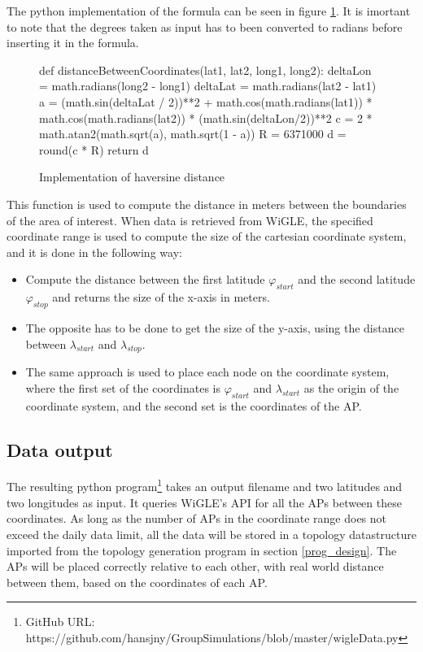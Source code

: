 The python implementation of the formula can be seen in figure \ref{fig:haversine}. It is imortant to note that the degrees taken as input
has to been converted to radians before inserting it in the formula. 

	\begin{figure}[H]
		\tiny
		\begin{python}
def distanceBetweenCoordinates(lat1, lat2, long1, long2):
	deltaLon = math.radians(long2 - long1)
	deltaLat = math.radians(lat2 - lat1)
	a = (math.sin(deltaLat / 2))**2 + math.cos(math.radians(lat1)) * math.cos(math.radians(lat2)) * (math.sin(deltaLon/2))**2
	c = 2 * math.atan2(math.sqrt(a), math.sqrt(1 - a)) 
	R = 6371000
	d = round(c * R)
	return d
	\end{python}
			\caption{Implementation of haversine distance}
			\label{fig:haversine}
	\end{figure}


This function is used to compute the distance in meters between the boundaries of the area of interest. When data is retrieved from
WiGLE, the specified coordinate range is used to compute the size of the cartesian coordinate system, and it is done in the following way:
\begin{itemize}
	\item Compute the distance between the first latitude $\varphi_{start}$ and the second latitude $\varphi_{stop}$ and returns the size of the x-axis in meters.
	\item The opposite has to be done to get the size of the y-axis, using the distance between $\lambda_{start}$ and $\lambda_{stop}$. 
	\item The same approach is used to place each node on the coordinate system, where the first set of the coordinates is
$\varphi_{start}$ and $\lambda_{start}$ as the origin of the coordinate system, and the second set is the coordinates of the AP.  

\end{itemize}
\subsection{Data output}
The resulting python program\footnote{GitHub URL: https://github.com/hansjny/GroupSimulations/blob/master/wigleData.py} takes an output filename and two latitudes and two longitudes as input.
It queries WiGLE's API for all the APs between these coordinates. As long as the number of APs in the coordinate range does not exceed the daily data limit, all the data will be stored in a topology datastructure imported 
from the topology generation program in section \ref{prog_design}. The APs will be placed correctly relative to each other, with real world distance between them,
based on the coordinates of each AP. 


